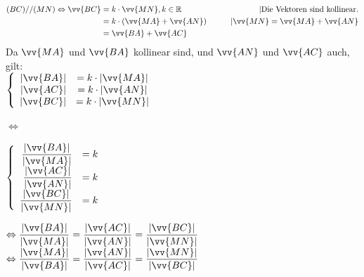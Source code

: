 \begin{Beweis}
  \begin{center}
    \begin{align*}
      (BC)//(MN)  \Leftrightarrow \vv{BC}  &= k\cdot\vv{MN},k\in \R              &\qquad | \text{Die Vektoren sind kollinear.} \\
                                           &= k\cdot (\vv{MA}+\vv{AN})           &\qquad | \vv{MN}=\vv{MA}+\vv{AN} \\
                                           &= \vv{BA}+\vv{AC}                    & \\
    \end{align*}
    Da $\vv{MA}$ und $\vv{BA}$ kollinear sind, und $\vv{AN}$ und $\vv{AC}$ auch, gilt:\\
    $\left\{\begin{array}{rcl}
        |\vv{BA}| &= k\cdot |\vv{MA}|\\
        |\vv{AC}| &= k\cdot |\vv{AN}|\\
        |\vv{BC}| &= k\cdot |\vv{MN}|
    \end{array} \right.$

    $\Leftrightarrow$

    $\left\{\begin{array}{rcl}
        \dfrac{|\vv{BA}|}{|\vv{MA}|} &= k\\
        \dfrac{|\vv{AC}|}{|\vv{AN}|} &= k\\
        \dfrac{|\vv{BC}|}{|\vv{MN}|} &= k
    \end{array} \right.$
  \end{center}
  $\Leftrightarrow \dfrac{|\vv{BA}|}{|\vv{MA}|} = \dfrac{|\vv{AC}|}{|\vv{AN}|} = \dfrac{|\vv{BC}|}{|\vv{MN}|}$
  $\Leftrightarrow \dfrac{|\vv{MA}|}{|\vv{BA}|} = \dfrac{|\vv{AN}|}{|\vv{AC}|} = \dfrac{|\vv{MN}|}{|\vv{BC}|}$
\end{Beweis}

